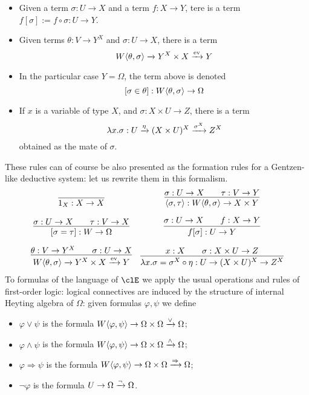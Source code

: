 \begin{definition}
\begin{itemize}
		\item Given a term $\sigma : U \to X$ and a term $f : X \to Y$, tere is a term $f[\sigma] := f\circ\sigma : U \to Y$.
		\item Given terms $\theta :  V \to Y^X$ and $\sigma : U\to X$, there is a term
		      \[
			      W\langle \theta,\sigma\rangle \xrightarrow{}Y^X\times X \xrightarrow{\text{ev}} Y
		      \]
		\item In the particular case $Y=\Omega$, the term above is denoted
		      \[[\sigma\in\theta] : W\langle \theta,\sigma\rangle \to \Omega\]
		\item If $x$ is a variable of type $X$, and $\sigma : X\times U \to Z$, there is a term
		      \[\lambda x.\sigma : U \xrightarrow{\eta} (X\times U)^X \xrightarrow{\sigma^X} Z^X\]
		      obtained as the mate of $\sigma$.
	\end{itemize}
	These rules can of course be also presented as the formation rules for a Gentzen-like deductive system: let us rewrite them in this formalism.
	\[ \begin{array}{cc}
			\infer{1_X : X \to X}{}                                                              &
			\infer{\lr{\sigma}{\tau} : W\lr{\theta}{\sigma} \to X \times Y }{\sigma : U \to X    &   & \tau : V \to Y}             \\[1em]
			\infer{[\sigma=\tau] : W \to \Omega}{\sigma : U \to X                                &   & \tau : V \to X}           &
			\infer{f[\sigma] : U \to Y}{\sigma : U \to X                                         &   & f : X \to Y}                \\[1em]
			\infer{W\lr{\theta}{\sigma} \xto{}Y^X\times X \xto{\text{ev}} Y}{\theta :  V \to Y^X &   & \sigma : U\to X}          &
			\infer{\lambda x.\sigma = \sigma^X\circ\eta : U \to (X\times U)^X \to Z^X}{ x: X     &   & \sigma : X\times U \to Z}
		\end{array}\]
	To formulas of the language of $\clE$ we apply the usual operations and rules of first-order logic: logical connectives are induced by the structure of internal Heyting algebra of $\Omega$: given formulas $\varphi,\psi$ we define
	\begin{itemize}
		\item $\varphi\lor \psi$ is the formula $W\langle \varphi,\psi\rangle \to \Omega\times \Omega \xrightarrow{\lor} \Omega$;
		\item $\varphi\land\psi$ is the formula $W\langle \varphi,\psi\rangle \to \Omega\times \Omega \xrightarrow{\land} \Omega$;
		\item $\varphi\Rightarrow\psi$ is the formula $W\langle \varphi,\psi\rangle \to \Omega\times \Omega \xrightarrow{\Rightarrow} \Omega$;
		\item $\lnot\varphi$ is the formula $U \to \Omega \xrightarrow{\lnot} \Omega$.
	\end{itemize}
\end{definition}
